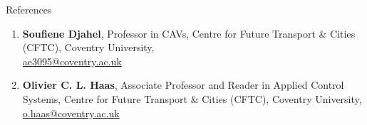 \documentclass{resume}
\begin{document}
\begin{rSection}{References}
\begin{enumerate}[left=-4mm] %
\item \textbf{Soufiene Djahel}, Professor in CAVs, Centre for Future Transport \& Cities (CFTC), Coventry University, \\\href{https://scholar.google.com/citations?hl=en&user=R6EbOZQAAAAJ}{} \href{https://www.linkedin.com/in/soufiene-djahel-714220b/}{} \href{https://pureportal.coventry.ac.uk/en/persons/soufiene-djahel}{} \href{mailto:ae3095@coventry.ac.uk}{ae3095@coventry.ac.uk} 
\item \textbf{Olivier C. L. Haas}, Associate Professor and Reader in Applied Control Systems, Centre for Future Transport \& Cities (CFTC), Coventry University, \href{https://scholar.google.com/citations?user=tvxtuLAAAAAJ&hl=en&authuser=1}{} \href{https://www.linkedin.com/in/olivier-haas-4440371a/}{} \href{https://pureportal.coventry.ac.uk/en/persons/o-c-l-haas}{} \href{mailto:o.haas@coventry.ac.uk}{o.haas@coventry.ac.uk} %

\end{enumerate}
\end{rSection}
\end{document}
